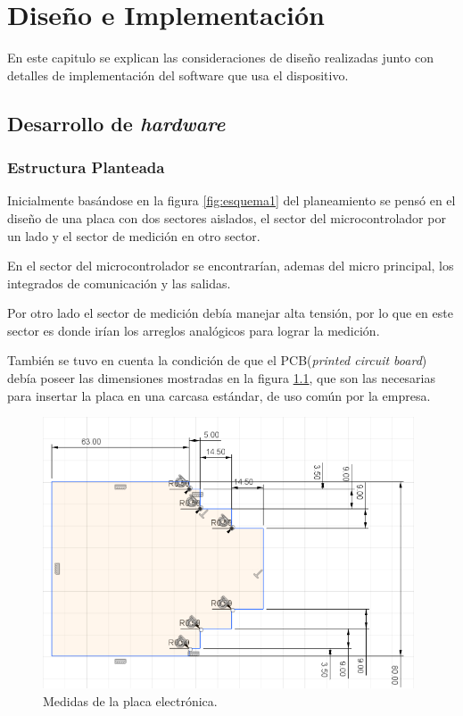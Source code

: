 \chapter{Diseño e Implementación} %

En este capitulo se explican las consideraciones de diseño realizadas junto con detalles de implementación del software que usa el dispositivo.
\label{Chapter3} 

\section{Desarrollo de \textit{hardware}}
 
\subsection{Estructura Planteada }

Inicialmente basándose en la figura \ref{fig:esquema1} del planeamiento  se pensó en el diseño de una placa con dos sectores aislados, el sector del microcontrolador por un lado y el sector de medición en otro sector.

En el sector del microcontrolador se encontrarían, ademas del micro principal, los integrados de comunicación y las salidas.

Por otro lado el sector de medición debía manejar alta tensión, por lo que en este sector es donde irían los arreglos analógicos para lograr la medición. 

También se tuvo en cuenta la condición de que el PCB(\textit{printed circuit board}) debía poseer las dimensiones mostradas en la figura \ref{fig:medidaspcb}, que son las necesarias para insertar la placa en una carcasa estándar, de uso común por la empresa.

\begin{figure}[h]
	\centering
	\includegraphics[width=110mm,keepaspectratio]{Figures/Placa1v6.png}
	\caption{Medidas de la placa electrónica.}
	\label{fig:medidaspcb}
\end{figure}

